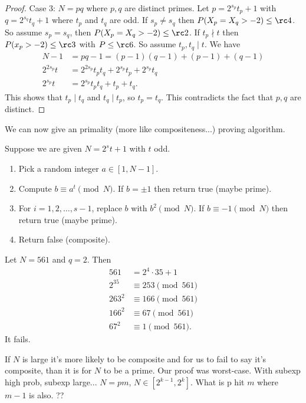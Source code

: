 \begin{proof}
Case 3: $N=pq$ where $p,q$ are distinct primes. Let $p=2^{s_p}t_p+1$ with $q=2^{s_q}t_q+1$ where $t_p$ and $t_q$ are odd. If $s_p\ne s_q$ then $P(X_p=X_q>-2)\le\rc 4$.
So assume $s_p=s_q$, then $P(X_p=X_q>-2)\le \rc 2$. If $t_p\nmid t$ then $P(x_p>-2)\le \rc 3$ with $P\le \rc 6$. So assume $t_p,t_q\mid t$. We have 
\begin{align*}
N-1&=pq-1=(p-1)(q-1)+(p-1)+(q-1)\\
2^{2s_p}t&=2^{2s_p}t_pt_q+2^{s_p}t_p+2^{s_p}t_q\\
2^{s_p}t&=2^{s_p}t_pt_q+t_p+t_q.
\end{align*}
This shows that $t_p\mid t_q$ and $t_q\mid t_p$, so $t_p=t_q$. This contradicts the fact that $p,q$ are distinct.
\end{proof}
We can now give an primality (more like compositeness...) proving algorithm.
\begin{thm}
Suppose we are given $N=2^st+1$ with $t$ odd.
\begin{enumerate}
\item
Pick a random integer $a\in [1,N-1]$.
\item
Compute $b\equiv a^t\pmod N$. If $b=\pm 1$ then return true (maybe prime).
\item 
For $i=1,2,\ldots, s-1$, replace $b$ with $b^2\pmod N$. If $b\equiv -1\pmod N$ then return true (maybe prime).
\item
Return false (composite).
\end{enumerate}
\end{thm}
\begin{ex}
Let $N=561$ and $q=2$. Then
\begin{align*}
561&=2^4\cdot 35+1\\
2^{35}&\equiv 253\pmod{561}\\
263^2&\equiv 166\pmod{561}\\
166^2&\equiv 67\pmod{561}\\
67^2&\equiv 1\pmod{561}.
\end{align*}
It fails.
\end{ex}
If $N$ is large it's more likely to be composite and for us to fail to say it's composite, than it is for $N$ to be a prime. Our proof was worst-case. With subexp high prob, subexp large... $N=pm$, $N\in[2^{k-1},2^k]$. What is p hit $m$ where $m-1$ is also. ??

